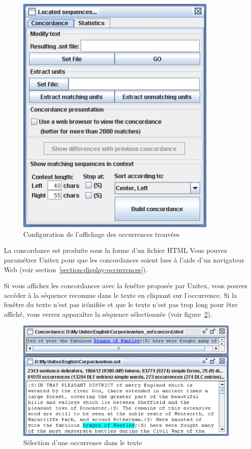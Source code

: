 \bigskip
\begin{figure}[!ht]
\begin{center}
\includegraphics[width=10cm]{resources/img/fig6-31.png}
\caption{Configuration de l’affichage des occurrences trouvées
\label{fig-configuration-display-occurrences}}
\end{center}
\end{figure}

\noindent La concordance est produite sous la forme d’un fichier HTML
 Vous pouvez paramétrer Unitex pour que les concordances soient lues
à l’aide d’un navigateur Web (voir section~\ref{section-display-occurrences}).

\bigskip
\noindent Si vous affichez les concordances avec la fenêtre proposée par Unitex, vous pouvez accéder
à la séquence reconnue dans le texte en cliquant sur l’occurrence. Si la fenêtre du texte n’est pas
icônifiée et que le texte n’est pas trop long pour être affiché, vous verrez apparaître
la séquence sélectionnée (voir figure~\ref{fig-back-to-text}).

\bigskip
\begin{figure}[!ht]
\begin{center}
\includegraphics[width=13.5cm]{resources/img/fig6-32.png}
\caption{Sélection d’une occurrence dans le texte\label{fig-back-to-text}}
\end{center}
\end{figure}

